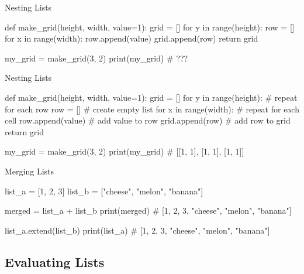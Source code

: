 \begin{frame}[fragile]{Nesting Lists}

        \begin{pythoncode}
def make_grid(height, width, value=1):
    grid = [] 
    for y in range(height):
        row = []
        for x in range(width):
           row.append(value)
        grid.append(row)
    return grid

my_grid = make_grid(3, 2)
print(my_grid) # ???

        \end{pythoncode}


\end{frame}

\begin{frame}[fragile]{Nesting Lists}

        \begin{pythoncode}
def make_grid(height, width, value=1):
    grid = []
    for y in range(height): # repeat for each row
        row = [] # create empty list
        for x in range(width): # repeat for each cell
           row.append(value) # add value to row
        grid.append(row) # add row to grid
    return grid	

my_grid = make_grid(3, 2)
print(my_grid) # [[1, 1], [1, 1], [1, 1]]

        \end{pythoncode}


\end{frame}

\begin{frame}[fragile]{Merging Lists}


    \begin{pythoncode}

list_a = [1, 2, 3]
list_b = ["cheese", "melon", "banana"]

merged = list_a + list_b
print(merged) # [1, 2, 3, "cheese", "melon", "banana"]

list_a.extend(list_b)
print(list_a) # [1, 2, 3, "cheese", "melon", "banana"]

	
	\end{pythoncode}


\end{frame}

\subsection{Evaluating Lists}

